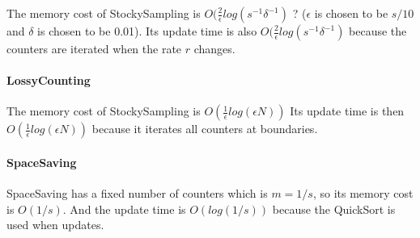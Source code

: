 \documentclass[10pt]{article}
\begin{document}
The memory cost of StockySampling is $O(\frac{2}{\epsilon}log(s^{-1}\delta^{-1})$ ? 
($\epsilon{}$ is chosen to be $s/10$ and $\delta{}$ is chosen to be 0.01).
Its update time is also $O(\frac{2}{\epsilon}log(s^{-1}\delta^{-1})$ because the counters are iterated when the rate $r$ changes.
\paragraph{LossyCounting}
The memory cost of StockySampling is $O(\frac{1}{\epsilon}log(\epsilon{}N))$ 
Its update time is then $O(\frac{1}{\epsilon}log(\epsilon{}N))$ because it iterates all counters at boundaries.
\paragraph{SpaceSaving}
SpaceSaving has a fixed number of counters which is $m = 1/s$, so its memory cost is $O(1/s)$. 
And the update time is $O(log(1/s))$ because the QuickSort is used when updates.



\end{document}
